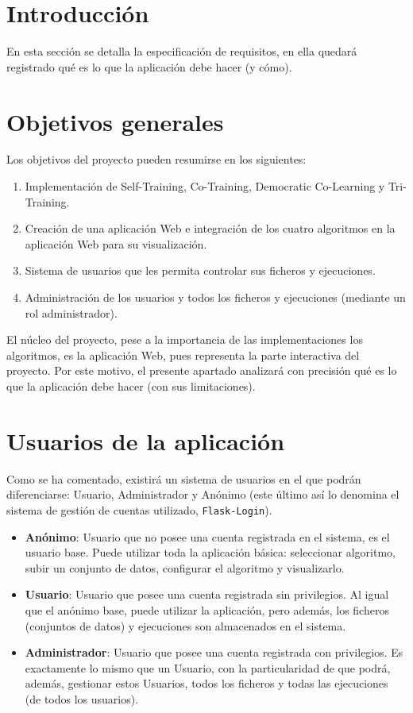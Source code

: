 
\section{Introducción}

En esta sección se detalla la especificación de requisitos, en ella quedará
registrado qué es lo que la aplicación debe hacer (y cómo).

\section{Objetivos generales}
Los objetivos del proyecto pueden resumirse en los siguientes:
\begin{enumerate}
    \item Implementación de Self-Training, Co-Training, Democratic Co-Learning y
    Tri-Training.
    \item Creación de una aplicación Web e integración de los cuatro algoritmos
    en la aplicación Web para su visualización.
    \item Sistema de usuarios que les permita controlar sus ficheros y
    ejecuciones.
    \item Administración de los usuarios y todos los ficheros y ejecuciones
    (mediante un rol administrador).
\end{enumerate}

El núcleo del proyecto, pese a la importancia de las implementaciones los
algoritmos, es la aplicación Web, pues representa la parte interactiva del
proyecto. Por este motivo, el presente apartado analizará con precisión qué es
lo que la aplicación debe hacer (con sus limitaciones).

\section{Usuarios de la aplicación}

Como se ha comentado, existirá un sistema de usuarios en el que podrán
diferenciarse: Usuario, Administrador y Anónimo (este último así lo denomina el
sistema de gestión de cuentas utilizado, \texttt{Flask-Login}). 

\begin{itemize}
	\item \textbf{Anónimo}: Usuario que no posee una cuenta registrada en el sistema, es
	el usuario base. Puede utilizar toda la aplicación básica: seleccionar
	algoritmo, subir un conjunto de datos, configurar el algoritmo y
	visualizarlo.
	\item \textbf{Usuario}: Usuario que posee una cuenta registrada sin privilegios. Al
	igual que el anónimo base, puede utilizar la aplicación, pero además, los
	ficheros (conjuntos de datos) y ejecuciones son almacenados en el sistema.
	\item \textbf{Administrador}: Usuario que posee una cuenta registrada con
	privilegios. Es exactamente lo mismo que un Usuario, con la particularidad
	de que podrá, además, gestionar estos Usuarios, todos los ficheros y todas
	las ejecuciones (de todos los usuarios). 
\end{itemize}

